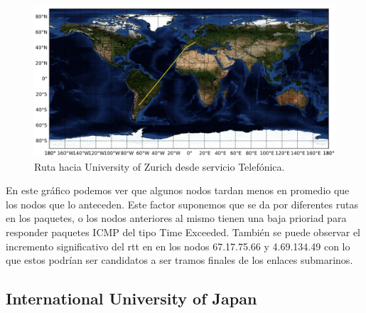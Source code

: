 \documentclass[10pt, a4paper]{article}
\begin{document}
\begin{figure}[H] %
\begin{center}
\includegraphics[width=400pt]{../imgs/map-uzh(telef).png}
\caption{Ruta hacia University of Zurich desde servicio Telefónica.}
\end{center}
\end{figure}


En este gráfico podemos ver que algunos nodos tardan menos en promedio que los nodos que lo anteceden. Este factor suponemos que se da por diferentes rutas en los paquetes, o los nodos anteriores al mismo tienen una baja prioriad para responder paquetes ICMP del tipo Time Exceeded.
También se puede observar el incremento significativo del rtt en en los nodos 67.17.75.66 y 4.69.134.49 con lo que estos podrían ser candidatos a ser tramos finales de los enlaces submarinos. 

\subsection{International University of Japan}
\end{document}
